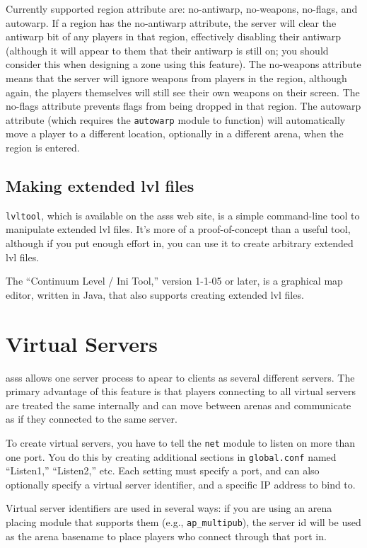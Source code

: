 \documentclass{article}
\newcommand{\asss}{asss}
\begin{document}
Currently supported region attribute are: no-antiwarp, no-weapons,
no-flags, and autowarp. If a region has the no-antiwarp attribute, the
server will clear the antiwarp bit of any players in that region,
effectively disabling their antiwarp (although it will appear to them
that their antiwarp is still on; you should consider this when designing
a zone using this feature). The no-weapons attribute means that the
server will ignore weapons from players in the region, although again,
the players themselves will still see their own weapons on their screen.
The no-flags attribute prevents flags from being dropped in that region.
The autowarp attribute (which requires the \verb/autowarp/ module to
function) will automatically move a player to a different location,
optionally in a different arena, when the region is entered.

\subsection{Making extended lvl files}

\verb/lvltool/, which is available on the \asss{} web site, is a simple
command-line tool to manipulate extended lvl files. It's more of a
proof-of-concept than a useful tool, although if you put enough effort
in, you can use it to create arbitrary extended lvl files.

The ``Continuum Level / Ini Tool,'' version 1-1-05 or later, is a
graphical map editor, written in Java, that also supports creating
extended lvl files.



\section{Virtual Servers}

\asss{} allows one server process to apear to clients as several
different servers. The primary advantage of this feature is that players
connecting to all virtual servers are treated the same internally and
can move between arenas and communicate as if they connected to the same
server.

To create virtual servers, you have to tell the \verb/net/ module to
listen on more than one port. You do this by creating additional
sections in \verb/global.conf/ named ``Listen1,'' ``Listen2,'' etc. Each
setting must specify a port, and can also optionally specify a virtual
server identifier, and a specific IP address to bind to.

Virtual server identifiers are used in several ways: if you are using an
arena placing module that supports them (e.g., \verb/ap_multipub/), the
server id will be used as the arena basename to place players who
connect through that port in.
\end{document}
